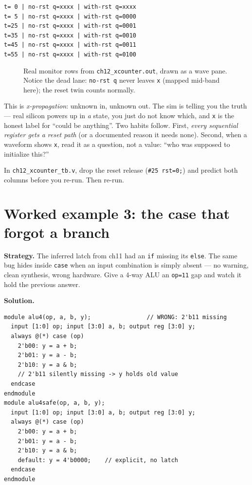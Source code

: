 \begin{lstlisting}[caption={Real run of \ttfamily
ch12\_xcounter\_tb.v. Notice: \texttt{x + 1 = x} forever --- arithmetic
on unknowns produces unknowns --- while the reset twin wakes at t=5
and counts.},abovecaptionskip=0pt,label={lst:xcounterout}]
t= 0 | no-rst q=xxxx | with-rst q=xxxx
t= 5 | no-rst q=xxxx | with-rst q=0000
t=25 | no-rst q=xxxx | with-rst q=0001
t=35 | no-rst q=xxxx | with-rst q=0010
t=45 | no-rst q=xxxx | with-rst q=0011
t=55 | no-rst q=xxxx | with-rst q=0100
\end{lstlisting}

\begin{figure}[htbp]
\centering

\caption{Real monitor rows from \texttt{ch12\_xcounter.out}, drawn as
a wave pane. Notice the dead lane: \texttt{no-rst q} never leaves
\texttt{x} (mapped mid-band here); the reset twin counts normally.}
\label{fig:xprop}
\end{figure}

This is \emph{x-propagation}: unknown in, unknown out. The sim is
telling you the truth --- real silicon powers up in \emph{a} state,
you just do not know which, and \texttt{x} is the honest label for
``could be anything''. Two habits follow. First, \emph{every
sequential register gets a reset path} (or a documented reason it
needs none). Second, when a waveform shows \texttt{x}, read it as a
question, not a value: ``who was supposed to initialize this?''

\begin{exercise}[medium]
In \texttt{ch12\_xcounter\_tb.v}, drop the reset release
(\texttt{\#25 rst=0;}) and predict both columns before you re-run.
Then re-run.
\end{exercise}

\section{Worked example 3: the case that forgot a branch}
\label{sec:we-caselatch}

\textbf{Strategy.} The inferred latch from ch11 had an \texttt{if}
missing its \texttt{else}. The same bug hides inside \texttt{case}
when an input combination is simply absent --- no warning, clean
synthesis, wrong hardware. Give a 4-way ALU an
\texttt{op=11} gap and watch it hold the previous answer.

\textbf{Solution.}
\begin{lstlisting}[caption={\ttfamily code/ch12\_caselatch.v ---
identical except the \texttt{default}.},label={lst:caselatch}]
module alu4(op, a, b, y);                // WRONG: 2'b11 missing
  input [1:0] op; input [3:0] a, b; output reg [3:0] y;
  always @(*) case (op)
    2'b00: y = a + b;
    2'b01: y = a - b;
    2'b10: y = a & b;
    // 2'b11 silently missing -> y holds old value
  endcase
endmodule
module alu4safe(op, a, b, y);
  input [1:0] op; input [3:0] a, b; output reg [3:0] y;
  always @(*) case (op)
    2'b00: y = a + b;
    2'b01: y = a - b;
    2'b10: y = a & b;
    default: y = 4'b0000;    // explicit, no latch
  endcase
endmodule
\end{lstlisting}

